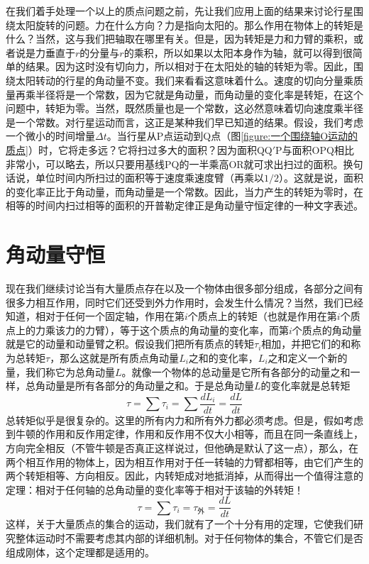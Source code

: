 在我们着手处理一个以上的质点问题之前，先让我们应用上面的结果来讨论行星围绕太阳旋转的问题。力在什么方向？力是指向太阳的。那么作用在物体上的转矩是什么？当然，这与我们把轴取在哪里有关。但是，因为转矩是力和力臂的乘积，或者说是力垂直于$r$的分量与$r$的乘积，所以如果以太阳本身作为轴，就可以得到很简单的结果。因为这时没有切向力，所以相对于在太阳处的轴的转矩为零。因此，围绕太阳转动的行星的角动量不变。我们来看看这意味着什么。速度的切向分量乘质量再乘半径将是一个常数，因为它就是角动量，而角动量的变化率是转矩，在这个问题中，转矩为零。当然，既然质量也是一个常数，这必然意味着切向速度乘半径是一个常数。对行星运动而言，这正是某种我们早已知道的结果。假设，我们考虑一个微小的时间增量$\Delta t$。当行星从P点运动到Q点（图\ref{figure:一个围绕轴O运动的质点}）时，它将走多远？它将扫过多大的面积？因为面积QQ$'$P与面积OPQ相比非常小，可以略去，所以只要用基线PQ的一半乘高OR就可求出扫过的面积。换句话说，单位时间内所扫过的面积等于速度乘速度臂（再乘以$1/2$）。这就是说，面积的变化率正比于角动量，而角动量是一个常数。因此，当力产生的转矩为零时，在相等的时间内扫过相等的面积的开普勒定律正是角动量守恒定律的一种文字表述。

\section{角动量守恒}

现在我们继续讨论当有大量质点存在以及一个物体由很多部分组成，各部分之间有很多力相互作用，同时它们还受到外力作用时，会发生什么情况？当然，我们已经知道，相对于任何一个固定轴，作用在第$i$个质点上的转矩（也就是作用在第$i$个质点上的力乘该力的力臂），等于这个质点的角动量的变化率，而第$i$个质点的角动量就是它的动量和动量臂之积。假设我们把所有质点的转矩$\tau_i$相加，并把它们的和称为总转矩$\tau$，那么这就是所有质点角动量$L_i$之和的变化率，$L_i$之和定义一个新的量，我们称它为总角动量$L$。就像一个物体的总动量是它所有各部分的动量之和一样，总角动量是所有各部分的角动量之和。于是总角动量$L$的变化率就是总转矩
\begin{equation}
    \label{Eq:I:18:18}
    \tau = \sum \tau_i = \sum \frac{dL_i}{dt} = \frac{dL}{dt}
\end{equation}
总转矩似乎是很复杂的。这里的所有内力和所有外力都必须考虑。但是，假如考虑到牛顿的作用和反作用定律，作用和反作用不仅大小相等，而且在同一条直线上，方向完全相反（不管牛顿是否真正这样说过，但他确是默认了这一点），那么，在两个相互作用的物体上，因为相互作用对于任一转轴的力臂都相等，由它们产生的两个转矩相等、方向相反。因此，内转矩成对地抵消掉，从而得出一个值得注意的定理：相对于任何轴的总角动量的变化率等于相对于该轴的外转矩！
\begin{equation}
    \label{Eq:I:18:19}
    \tau = \sum \tau_i = \tau_\text{外} = \frac{dL}{dt}
\end{equation}
这样，关于大量质点的集合的运动，我们就有了一个十分有用的定理，它使我们研究整体运动时不需要考虑其内部的详细机制。对于任何物体的集合，不管它们是否组成刚体，这个定理都是适用的。

